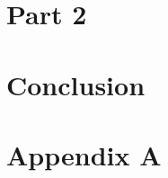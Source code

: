 \documentclass{ueacmpstyle}
\begin{document}
        
    \section{Part 2}\label{sec:Pt2}

    \section{Conclusion}\label{sec:Con}
    
    

	
	
	\newpage
	
	\appendix
        \section{Appendix A}\label{app:A}   %
            \newpage
\end{document}
